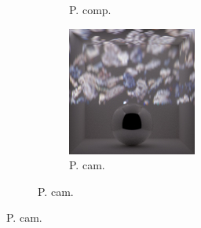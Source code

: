 \begin{figure}[]
\begin{subfigure}{\textwidth}
\begin{subfigure}{0.19\textwidth}
            \caption{P. comp.}
            \label{fig:ex03-ball_dof-pebbles-pixel_im}
        \end{subfigure}
        \hfill
        \begin{subfigure}{0.19\textwidth}
            \centering
            \includegraphics[width=\textwidth]{images/04-experiment03/ball_dof/pebbles/pixel_proj.jpg}
            \caption{P. cam.}
            \label{fig:ex03-ball_dof-pebbles-pixel_proj}
        \end{subfigure}
        

\end{subfigure}
\end{figure}
